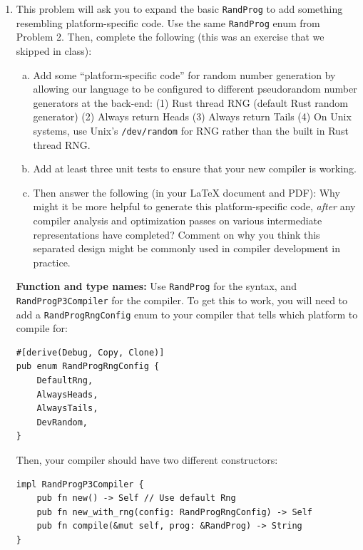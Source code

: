 \documentclass{article}
\theoremstyle{plain}
\begin{document}
\begin{enumerate}
For the unit tests in (a) and (c),
please name these \texttt{test\_2a}, \texttt{test\_2c\_1}, and \texttt{test\_2c\_2}. (You may add other unit tests with other names.)


\item
This problem will ask you to expand the basic \texttt{RandProg}
to add something resembling platform-specific code.
Use the same \texttt{RandProg} enum from Problem 2.
Then, complete the following
(this was an exercise that we skipped in class):

\begin{enumerate}[(a)]
\item
Add some ``platform-specific code'' for random number generation by
allowing our language to be configured to different pseudorandom number generators at the back-end:
(1) Rust thread RNG (default Rust random generator)
(2) Always return Heads
(3) Always return Tails
(4) On Unix systems, use Unix's \texttt{/dev/random} for RNG rather than the built in Rust thread RNG.

\item
Add at least three unit tests to ensure that your new compiler is working.

\item
Then answer the following (in your LaTeX document and PDF):
Why might it be more helpful to generate this platform-specific code,
\emph{after} any compiler analysis and optimization passes on various intermediate representations have completed?
Comment on why you think this separated design might be commonly used
in compiler development in practice.
\end{enumerate}

\textbf{Function and type names:}
Use \texttt{RandProg} for the syntax, and \texttt{RandProgP3Compiler} for the compiler.
To get this to work, you will need to add a \texttt{RandProgRngConfig} enum to your compiler that tells which platform to compile for:
\begin{verbatim}
#[derive(Debug, Copy, Clone)]
pub enum RandProgRngConfig {
    DefaultRng,
    AlwaysHeads,
    AlwaysTails,
    DevRandom,
}
\end{verbatim}

Then, your compiler should have two different constructors:
\begin{verbatim}
impl RandProgP3Compiler {
    pub fn new() -> Self // Use default Rng
    pub fn new_with_rng(config: RandProgRngConfig) -> Self
    pub fn compile(&mut self, prog: &RandProg) -> String
}
\end{verbatim}


\end{enumerate}
\end{document}
